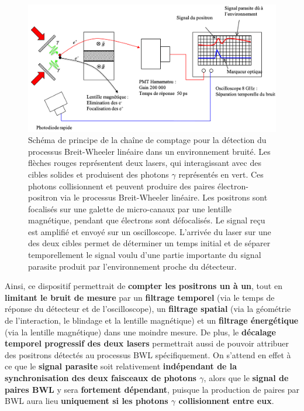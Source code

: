 \begin{refsection}
\begin{figure}[t]
	\centering
	\includegraphics[width=\linewidth]{3-experience/chaine_comptage.png}
	\caption{Schéma de principe de la chaîne de comptage pour la détection du processus Breit-Wheeler linéaire dans un environnement bruité. Les flèches rouges représentent deux lasers, qui interagissant avec des cibles solides et produisent des photons $\gamma$ représentés en vert. Ces photons collisionnent et peuvent produire des paires électron-positron via le processus Breit-Wheeler linéaire. Les positrons sont focalisés sur une galette de micro-canaux par une lentille magnétique, pendant que électrons sont défocalisés. Le signal reçu est amplifié et envoyé sur un oscilloscope. L'arrivée du laser sur une des deux cibles permet de déterminer un temps initial et de séparer temporellement le signal voulu d'une partie importante du signal parasite produit par l'environnement proche du détecteur.}
	\label{fig:3-principe_comptage}
\end{figure}

Ainsi, ce dispositif permettrait de \textbf{compter les positrons un à un}, tout en \textbf{limitant le bruit de mesure} par un \textbf{filtrage temporel} (via le temps de réponse du détecteur et de l'oscilloscope), un \textbf{filtrage spatial} (via la géométrie de l'interaction, le blindage et la lentille magnétique) et un \textbf{filtrage énergétique} (via la lentille magnétique) dans une moindre mesure. De plus, le \textbf{décalage temporel progressif des deux lasers} permettrait aussi de pouvoir attribuer des positrons détectés au processus BWL spécifiquement. On s'attend en effet à ce que le \textbf{signal parasite} soit relativement \textbf{indépendant de la synchronisation des deux faisceaux de photons $\gamma$}, alors que le \textbf{signal de paires BWL} y sera \textbf{fortement dépendant}, puisque la production de paires par BWL aura lieu \textbf{uniquement si les photons $\gamma$ collisionnent entre eux}. 


\end{refsection}
